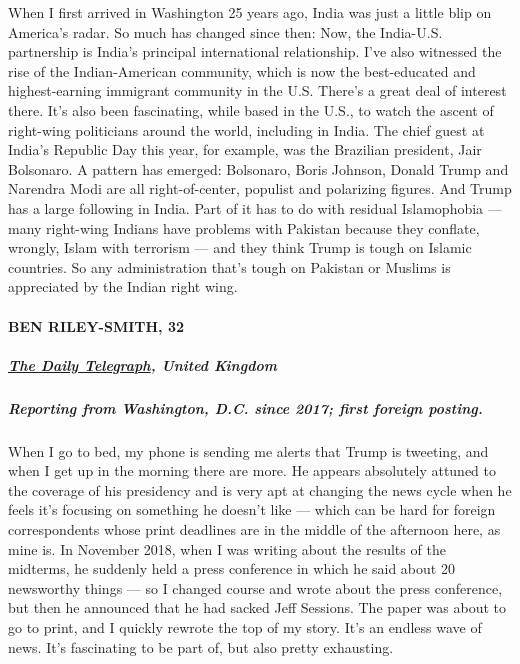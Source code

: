 When I first arrived in Washington 25 years ago, India was just a little
blip on America's radar. So much has changed since then: Now, the
India-U.S. partnership is India's principal international relationship.
I've also witnessed the rise of the Indian-American community, which is
now the best-educated and highest-earning immigrant community in the
U.S. There's a great deal of interest there. It's also been fascinating,
while based in the U.S., to watch the ascent of right-wing politicians
around the world, including in India. The chief guest at India's
Republic Day this year, for example, was the Brazilian president, Jair
Bolsonaro. A pattern has emerged: Bolsonaro, Boris Johnson, Donald Trump
and Narendra Modi are all right-of-center, populist and polarizing
figures. And Trump has a large following in India. Part of it has to do
with residual Islamophobia --- many right-wing Indians have problems
with Pakistan because they conflate, wrongly, Islam with terrorism ---
and they think Trump is tough on Islamic countries. So any
administration that's tough on Pakistan or Muslims is appreciated by the
Indian right wing.

\hypertarget{ben-riley-smith-32}{%
\paragraph{BEN RILEY-SMITH, 32}\label{ben-riley-smith-32}}

\hypertarget{the-daily-telegraph-united-kingdom}{%
\subparagraph{\texorpdfstring{\textbf{\href{https://www.telegraph.co.uk/}{The
Daily Telegraph}, United
Kingdom}}{The Daily Telegraph, United Kingdom}}\label{the-daily-telegraph-united-kingdom}}

\hypertarget{reporting-from-washington-dc-since-2017-first-foreign-posting-3}{%
\subparagraph{\texorpdfstring{\textbf{Reporting from Washington, D.C.
since 2017; first foreign
posting.}}{Reporting from Washington, D.C. since 2017; first foreign posting.}}\label{reporting-from-washington-dc-since-2017-first-foreign-posting-3}}

When I go to bed, my phone is sending me alerts that Trump is tweeting,
and when I get up in the morning there are more. He appears absolutely
attuned to the coverage of his presidency and is very apt at changing
the news cycle when he feels it's focusing on something he doesn't like
--- which can be hard for foreign correspondents whose print deadlines
are in the middle of the afternoon here, as mine is. In November 2018,
when I was writing about the results of the midterms, he suddenly held a
press conference in which he said about 20 newsworthy things --- so I
changed course and wrote about the press conference, but then he
announced that he had sacked Jeff Sessions. The paper was about to go to
print, and I quickly rewrote the top of my story. It's an endless wave
of news. It's fascinating to be part of, but also pretty exhausting.

